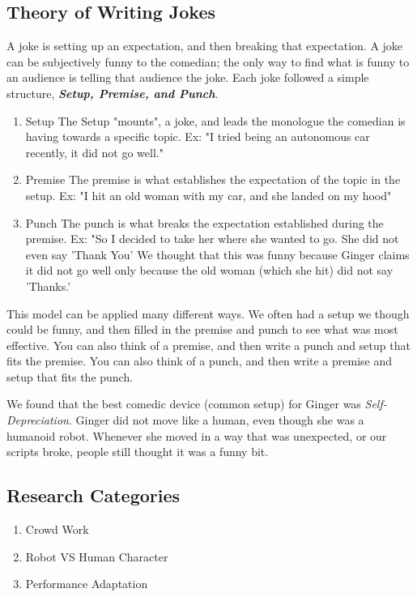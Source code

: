 \documentclass[onecolumn, draftclsnofoot,10pt, compsoc]{IEEEtran}
\begin{document}
\subsection{Theory of Writing Jokes}
A joke is setting up an expectation, and then breaking that expectation.
A joke can be subjectively funny to the comedian; the only way to find what is funny to an audience is telling that audience the joke.
Each joke followed a simple structure, \textit{\textbf{Setup, Premise, and Punch}}.

    \begin{enumerate}
        \item{Setup}
            The Setup "mounts", a joke, and leads the monologue the comedian is having towards a specific topic.
            Ex: "I tried being an autonomous car recently, it did not go well."
        \item{Premise}
            The premise is what establishes the expectation of the topic in the setup.
            Ex: "I hit an old woman with my car, and she landed on my hood"
        \item{Punch}
            The punch is what breaks the expectation established during the premise.
            Ex: "So I decided to take her where she wanted to go. She did not even say 'Thank You'
            We thought that this was funny because Ginger claims it did not go well only because the old woman (which she hit) did not say 'Thanks.'
    \end{enumerate}

This model can be applied many different ways. 
We often had a setup we though could be funny, and then filled in the premise and punch to see what was most effective.
You can also think of a premise, and then write a punch and setup that fits the premise.
You can also think of a punch, and then write a premise and setup that fits the punch.

We found that the best comedic device (common setup) for Ginger was \textit{Self-Depreciation}. 
Ginger did not move like a human, even though she was a humanoid robot.
Whenever she moved in a way that was unexpected, or our scripts broke, people still thought it was a funny bit.

\subsection{Research Categories}

		\begin{enumerate}
			\item Crowd Work
			\item Robot VS Human Character
			\item Performance Adaptation
		\end{enumerate}
\end{document}
